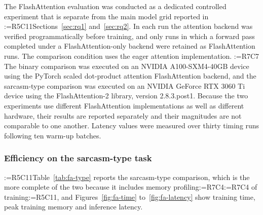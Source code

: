 \documentclass[a4paper,fleqn]{cas-sc}
\makeatletter
\newif\iftracked
\newcommand{\rv@setcolour}[1]{%
  \IfStrEq{#1}{R7C7}{\color{rvEdit}}{%
    \IfSubStr{#1}{R5}{\IfSubStr{#1}{R7}{\color{rvBoth}}{\color{rvFive}}}{\color{rvSeven}}}}
\newcommand{\rv@tag}[1]{\textsuperscript{\sffamily\bfseries\scriptsize[\StrSubstitute{#1}{,}{, }]}\,}
\newcommand{\rv@recordone}[1]{%
  \edef\rv@i{#1}%
  \ifcsdef{rv@n@\rv@i}{}{\csgdef{rv@n@\rv@i}{0}}%
  \csxdef{rv@n@\rv@i}{\the\numexpr\csuse{rv@n@\rv@i}+1\relax}%
  \begingroup\edef\@currentlabel{\rv@i}\label{rv:\rv@i:\csuse{rv@n@\rv@i}}\endgroup}
\newcommand{\rv@record}[1]{\@for\rv@id:=#1\do{\expandafter\rv@recordone\expandafter{\rv@id}}}
\DeclareRobustCommand{\rc}[2]{\rv@record{#1}\iftracked{\rv@setcolour{#1}\rv@tag{#1}#2}\else#2\fi}
\DeclareRobustCommand{\rcdel}[2]{\rv@record{#1}\iftracked{\rv@setcolour{#1}\rv@tag{#1}\rv@strike{#2}}\else\unskip\fi}
\DeclareRobustCommand{\rcrep}[3]{\rv@record{#1}\iftracked{\rv@setcolour{#1}\rv@tag{#1}\rv@strike{#2} #3}\else#3\fi}
\makeatother
\begin{document}
The FlashAttention evaluation was conducted as a dedicated controlled experiment that is separate from the main model grid reported in \rcrep{R5C11}{Sections 6 and 6}{Sections~\ref{sec:rq1} and~\ref{sec:rq2}}. In each run the attention backend was verified programmatically before training, and only runs in which a forward pass completed under a FlashAttention-only backend were retained as FlashAttention runs. The comparison condition uses the eager attention implementation. \rcdel{R7C7}{Because the two tasks were executed on different available hardware, the binary and sarcasm-type efficiency results are reported separately and are not pooled.} The binary comparison was executed on an NVIDIA A100-SXM4-40GB device using the PyTorch scaled dot-product attention FlashAttention backend, and the sarcasm-type comparison was executed on an NVIDIA GeForce RTX 3060 Ti device using the FlashAttention-2 library, version 2.8.3.post1. Because the two experiments use different FlashAttention implementations as well as different hardware, their results are reported separately and their magnitudes are not comparable to one another. Latency values were measured over thirty timing runs following ten warm-up batches.

\subsubsection{Efficiency on the sarcasm-type task}
\label{sec:efficiency-type}
\rcrep{R5C11}{Table 10}{Table~\ref{tab:fa-type}} reports the sarcasm-type comparison, which is the more complete of the two because it includes memory profiling\rcdel{R7C4}{for both training and inference}\rc{R7C4}{ of training}\rc{R5C11}{, and Figures~\ref{fig:fa-time} to~\ref{fig:fa-latency} show training time, peak training memory and inference latency}.
\end{document}
